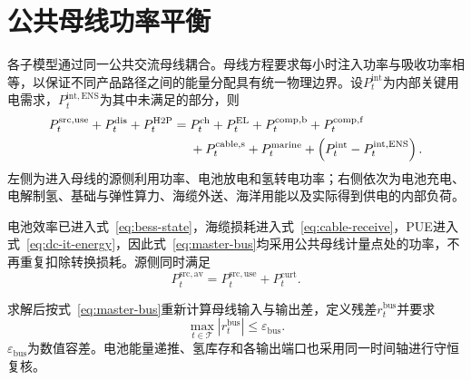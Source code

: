 \section{公共母线功率平衡}
\label{sec:power-balance}

各子模型通过同一公共交流母线耦合。母线方程要求每小时注入功率与吸收功率相等，以保证不同产品路径之间的能量分配具有统一物理边界。设$P_t^{\mathrm{int}}$为内部关键用电需求，$P_t^{\mathrm{int,ENS}}$为其中未满足的部分，则
\begin{align}
P_t^{\mathrm{src,use}}+P_t^{\mathrm{dis}}+P_t^{\mathrm{H2P}}
={}&P_t^{\mathrm{ch}}+P_t^{\mathrm{EL}}
+P_t^{\mathrm{comp,b}}+P_t^{\mathrm{comp,f}}\notag\\
&+P_t^{\mathrm{cable,s}}
+P_t^{\mathrm{marine}}
+\left(P_t^{\mathrm{int}}-P_t^{\mathrm{int,ENS}}\right).
\label{eq:master-bus}
\end{align}
左侧为进入母线的源侧利用功率、电池放电和氢转电功率；右侧依次为电池充电、电解制氢、基础与弹性算力、海缆外送、海洋用能以及实际得到供电的内部负荷。

电池效率已进入式~\eqref{eq:bess-state}，海缆损耗进入式~\eqref{eq:cable-receive}，PUE进入式~\eqref{eq:dc-it-energy}，因此式~\eqref{eq:master-bus}均采用公共母线计量点处的功率，不再重复扣除转换损耗。源侧同时满足
\begin{equation}
P_t^{\mathrm{src,av}}
=P_t^{\mathrm{src,use}}+P_t^{\mathrm{curt}}.
\label{eq:bus-source-split}
\end{equation}

求解后按式~\eqref{eq:master-bus}重新计算母线输入与输出差，定义残差$r_t^{\mathrm{bus}}$并要求
\begin{equation}
\max_{t\in\mathcal T}|r_t^{\mathrm{bus}}|
\le\varepsilon_{\mathrm{bus}}.
\label{eq:bus-residual}
\end{equation}
$\varepsilon_{\mathrm{bus}}$为数值容差。电池能量递推、氢库存和各输出端口也采用同一时间轴进行守恒复核。

